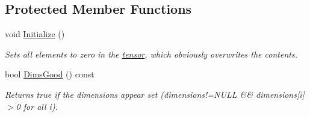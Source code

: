 \subsection*{Protected Member Functions}
\begin{DoxyCompactItemize}
\item 
void \hyperlink{classJKBuilder_1_1DistributedMatrix_a98b1050f09da390896f964fb7a892391}{Initialize} ()
\begin{DoxyCompactList}\small\item\em Sets all elements to zero in the \hyperlink{classJKBuilder_1_1tensor}{tensor}, which obviously overwrites the contents. \item\end{DoxyCompactList}\item 
bool \hyperlink{classJKBuilder_1_1tensor_a6e72344440b411f433eb50171648c2d0}{DimsGood} () const 
\begin{DoxyCompactList}\small\item\em Returns true if the dimensions appear set (dimensions!=NULL \&\& dimensions\mbox{[}i\mbox{]}$>$0 for all i). \item\end{DoxyCompactList}\end{DoxyCompactItemize}
